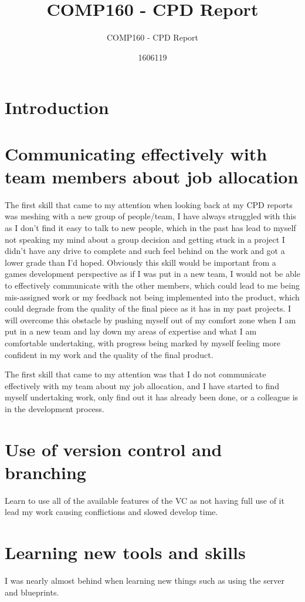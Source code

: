 \documentclass{scrartcl}
\title{COMP160 - CPD Report}
\subtitle{COMP160 - CPD Report}
\author{1606119}
\begin{document}
\maketitle

\section{Introduction}



\section{Communicating effectively with team members about job allocation}
The ﬁrst skill that came to my attention when looking back at my CPD reports was
meshing with a new group of people/team, I have always struggled with this as I don’t
ﬁnd it easy to talk to new people, which in the past has lead to myself not speaking
my mind about a group decision and getting stuck in a project I didn’t have any drive
to complete and such feel behind on the work and got a lower grade than I’d hoped.
Obviously this skill would be important from a games development perspective as if I
was put in a new team, I would not be able to eﬀectively communicate with the other
members, which could lead to me being mis-assigned work or my feedback not being
implemented into the product, which could degrade from the quality of the ﬁnal piece
as it has in my past projects. I will overcome this obstacle by pushing myself out of
my comfort zone when I am put in a new team and lay down my areas of expertise and
what I am comfortable undertaking, with progress being marked by myself feeling more
conﬁdent in my work and the quality of the ﬁnal product.

The first skill that came to my attention was that I do not communicate effectively with my team about my job allocation, and I have started to find myself undertaking work, only find out it has already been done, or a colleague is in the development process. 

\section{Use of version control and branching}
Learn to use all of the available features of the VC as not having full use of it lead my work causing conflictions and slowed develop time. 


\section{Learning new tools and skills}
I was nearly almost behind when learning new things such as using the server and blueprints. 
\end{document}
